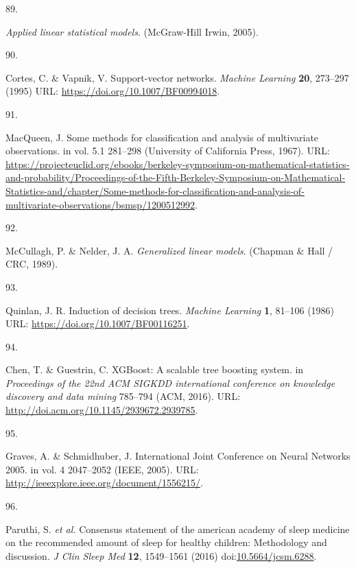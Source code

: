 \documentclass[
  10pt,
]{scrbook}
\newlength{\cslhangindent}
\newlength{\csllabelwidth}
\newlength{\cslentryspacingunit} %
\newenvironment{CSLReferences}[2] %
 {%
  \setlength{\parindent}{0pt}
  \ifodd #1
  \let\oldpar\par
  \def\par{\hangindent=\cslhangindent\oldpar}
  \fi
  \setlength{\parskip}{#2\cslentryspacingunit}
 }%
 {}
\newcommand{\CSLLeftMargin}[1]{\parbox[t]{\csllabelwidth}{#1}}
\newcommand{\CSLRightInline}[1]{\parbox[t]{\linewidth - \csllabelwidth}{#1}\break}
\let\originaltextbf\textbf
\renewcommand{\textbf}[1]{\textcolor{color1}{\originaltextbf{#1}}}
\begin{document}
\begin{CSLReferences}{0}{0}
\leavevmode{}%
\CSLLeftMargin{89. }%
\CSLRightInline{\emph{Applied linear statistical models}. (McGraw-Hill
Irwin, 2005).}

\leavevmode{}%
\CSLLeftMargin{90. }%
\CSLRightInline{Cortes, C. \& Vapnik, V. Support-vector networks.
\emph{Machine Learning} \textbf{20}, 273--297 (1995) URL:
\url{https://doi.org/10.1007/BF00994018}.}

\leavevmode{}%
\CSLLeftMargin{91. }%
\CSLRightInline{MacQueen, J. Some methods for classification and
analysis of multivariate observations. in vol. 5.1 281--298 (University
of California Press, 1967). URL:
\url{https://projecteuclid.org/ebooks/berkeley-symposium-on-mathematical-statistics-and-probability/Proceedings-of-the-Fifth-Berkeley-Symposium-on-Mathematical-Statistics-and/chapter/Some-methods-for-classification-and-analysis-of-multivariate-observations/bsmsp/1200512992}.}

\leavevmode{}%
\CSLLeftMargin{92. }%
\CSLRightInline{McCullagh, P. \& Nelder, J. A. \emph{Generalized linear
models}. (Chapman \& Hall / CRC, 1989).}

\leavevmode{}%
\CSLLeftMargin{93. }%
\CSLRightInline{Quinlan, J. R. Induction of decision trees.
\emph{Machine Learning} \textbf{1}, 81--106 (1986) URL:
\url{https://doi.org/10.1007/BF00116251}.}

\leavevmode{}%
\CSLLeftMargin{94. }%
\CSLRightInline{Chen, T. \& Guestrin, C. {XGBoost}: A scalable tree
boosting system. in \emph{Proceedings of the 22nd ACM SIGKDD
international conference on knowledge discovery and data mining}
785--794 (ACM, 2016). URL:
\url{http://doi.acm.org/10.1145/2939672.2939785}.}

\leavevmode{}%
\CSLLeftMargin{95. }%
\CSLRightInline{Graves, A. \& Schmidhuber, J. International Joint
Conference on Neural Networks 2005. in vol. 4 2047--2052 (IEEE, 2005).
URL: \url{http://ieeexplore.ieee.org/document/1556215/}.}

\leavevmode{}%
\CSLLeftMargin{96. }%
\CSLRightInline{Paruthi, S. \emph{et al.} Consensus statement of the
american academy of sleep medicine on the recommended amount of sleep
for healthy children: Methodology and discussion. \emph{J Clin Sleep
Med} \textbf{12}, 1549--1561 (2016)
doi:\href{https://doi.org/10.5664/jcsm.6288}{10.5664/jcsm.6288}.}


\end{CSLReferences}
\end{document}
